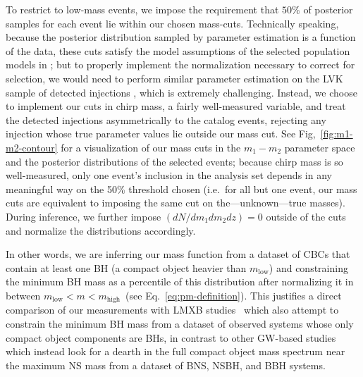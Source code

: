 \documentclass[modern]{aastex631}
\begin{document}
To restrict to low-mass events, we impose the requirement that $50\%$ of posterior samples
for each event lie within our chosen mass-cuts.  Technically speaking, because
the posterior distribution sampled by parameter estimation is a function of the
data, these cuts satisfy the model assumptions of the selected population models
in \citet{Mandel:2018mve}; but to properly implement the normalization necessary
to correct for selection, we would need to perform similar parameter estimation
on the LVK sample of detected injections \citep{KAGRA:2021duu}, which is
extremely challenging.  Instead, we choose to implement our cuts in chirp mass,
a fairly well-measured variable, and treat the detected injections
asymmetrically to the catalog events, rejecting any injection whose true
parameter values lie outside our mass cut.  See Fig,~\ref{fig:m1-m2-contour} for
a visualization of our mass cuts in the $m_1-m_2$ parameter space and the
posterior distributions of the selected events; because chirp mass is so
well-measured, only one event's inclusion in the analysis set depends in any
meaningful way on the 50\% threshold chosen (i.e.\ for all but one event, our
mass cuts are equivalent to imposing the same cut on the---unknown---true
masses). During inference, we further impose
$(dN/dm_1dm_2dz)=0$ outside of the cuts and normalize the distributions
accordingly. 

In other words, we are inferring our mass function from a dataset of CBCs that
contain at least one BH (a compact object heavier than $m_\mathrm{low}$) and
constraining the minimum BH mass as a percentile of this distribution after
normalizing it in between $m_\mathrm{low}<m<m_\mathrm{high}$~(see
Eq.~\eqref{eq:pm-definition}). This justifies a direct comparison of our
measurements with LMXB studies~\citep{Bailyn:1997xt, Farr:2010tu, Ozel:2010su}
which also attempt to constrain the minimum BH mass from a dataset of observed
systems whose only compact object components are BHs, in contrast to other GW-based studies~\citep{Farah:2021qom}
which instead look for a dearth in the full compact object mass spectrum near
the maximum NS mass from a dataset of BNS, NSBH, and BBH systems.
\end{document}
